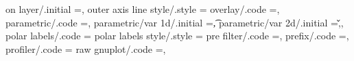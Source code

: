 {{{{{{{{{{{{{{{{{{{{{{{{{{{{{{{{{{{{{{{{{{{{{{{{{{{{{{{{{{{{{{{{{{{{{{{on layer/.initial                                                  =,                                                                                                                                  
outer axis line style/.style                                       ={                                                                                                                                  
overlay/.code                                                      ={},                                                   
parametric/.code                                                   ={},%
parametric/var 1d/.initial                                         =\t,                                                                                                                                
parametric/var 2d/.initial                                         ={\u,\v},                                                                                                                           
polar labels/.code                                                 ={                                                                                                                                  
polar labels style/.style                                          ={%
pre filter/.code                                                   ={},                                                                                                                                
prefix/.code                                                       ={},                                                   
profiler/.code                                                     ={%
raw gnuplot/.code                                                  ={},                                                   
}}}}}}}}}}}}}}}}}}}}}}}}}}}}}}}}}}}}}}}}}}}}}}}}}}}}}}}}}}}}}}}}}}}}}}}}}}}
